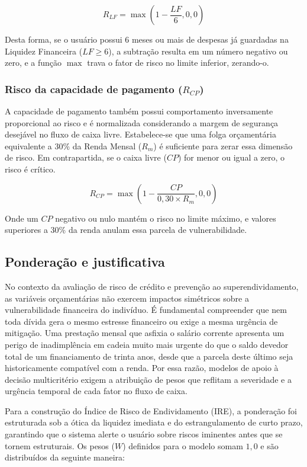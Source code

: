 \documentclass[portuguese]{sbc2025}%
\begin{document}
\begin{equation}
R_{LF} = \max\left( 1 - \frac{LF}{6}, 0{,}0 \right)
\end{equation}

Desta forma, se o usuário possui 6 meses ou mais de despesas já guardadas na Liquidez Financeira ($LF \ge 6$), a subtração resulta em um número negativo ou zero, e a função $\max$ trava o fator de risco no limite inferior, zerando-o.

\subsubsection{Risco da capacidade de pagamento ($R_{CP}$)}

A capacidade de pagamento também possui comportamento inversamente proporcional ao risco e é normalizada considerando a margem de segurança desejável no fluxo de caixa livre. Estabelece-se que uma folga orçamentária equivalente a 30\% da Renda Mensal ($R_m$) é suficiente para zerar essa dimensão de risco. Em contrapartida, se o caixa livre ($CP$) for menor ou igual a zero, o risco é crítico.

\begin{equation}
R_{CP} = \max\left( 1 - \frac{CP}{0{,}30 \times R_m}, 0{,}0 \right)
\end{equation}

Onde um $CP$ negativo ou nulo mantém o risco no limite máximo, e valores superiores a 30\% da renda anulam essa parcela de vulnerabilidade.

\subsection{Ponderação e justificativa}

No contexto da avaliação de risco de crédito e prevenção ao superendividamento, as variáveis orçamentárias não exercem impactos simétricos sobre a vulnerabilidade financeira do indivíduo. É fundamental compreender que nem toda dívida gera o mesmo estresse financeiro ou exige a mesma urgência de mitigação. Uma prestação mensal que asfixia o salário corrente apresenta um perigo de inadimplência em cadeia muito mais urgente do que o saldo devedor total de um financiamento de trinta anos, desde que a parcela deste último seja historicamente compatível com a renda. Por essa razão, modelos de apoio à decisão multicritério exigem a atribuição de pesos que reflitam a severidade e a urgência temporal de cada fator no fluxo de caixa.

Para a construção do Índice de Risco de Endividamento (IRE), a ponderação foi estruturada sob a ótica da liquidez imediata e do estrangulamento de curto prazo, garantindo que o sistema alerte o usuário sobre riscos iminentes antes que se tornem estruturais. Os pesos ($W$) definidos para o modelo somam $1{,}0$ e são distribuídos da seguinte maneira:
\end{document}

